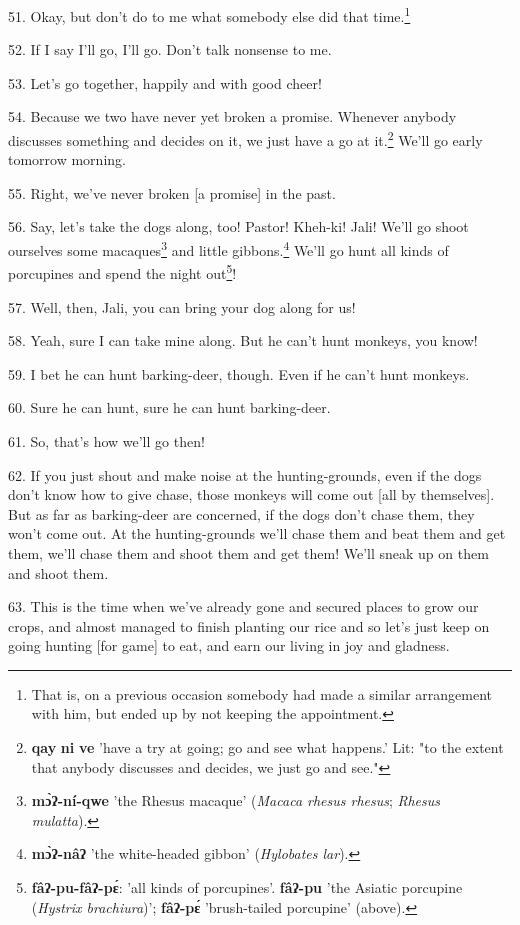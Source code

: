 51. Okay, but don't do to me what somebody else did that time.\footnote{That is, on a previous occasion somebody had made a similar arrangement with him, but ended up by not keeping the appointment.}

52. If I say I'll go, I'll go. Don't talk nonsense to me.

53. Let's go together, happily and with good cheer!

54. Because we two have never yet broken a promise. Whenever anybody discusses
something and decides on it, we just have a go at it.\footnote{\textbf{qay} \textbf{ni} \textbf{ve} 'have a try at going; go and see what happens.' Lit: "to the extent that anybody discusses and decides, we just go and see."} We'll go early tomorrow
morning.

55. Right, we've never broken [a promise] in the past.

56. Say, let's take the dogs along, too! Pastor! Kheh-ki! Jali! We'll go shoot
ourselves some macaques\footnote{\textbf{mɔ̀ʔ-ní-qwe} 'the Rhesus macaque' (\textit{Macaca rhesus rhesus}; \textit{Rhesus mulatta}).} and little gibbons.\footnote{\textbf{mɔ̀ʔ-nâʔ} 'the white-headed gibbon' (\textit{Hylobates lar}).} We'll go hunt all kinds of
porcupines and spend the night out\footnote{\textbf{fâʔ-pu-fâʔ-pɛ́}: 'all kinds of porcupines'. \textbf{fâʔ-pu} 'the Asiatic porcupine (\textit{Hystrix brachiura})'; \textbf{fâʔ-pɛ́} 'brush-tailed porcupine' (above).}!

57. Well, then, Jali, you can bring your dog along for us!

58. Yeah, sure I can take mine along. But he can't hunt monkeys, you know!

59. I bet he can hunt barking-deer, though. Even if he can't hunt monkeys.

60. Sure he can hunt, sure he can hunt barking-deer.

61. So, that's how we'll go then!

62. If you just shout and make noise at the hunting-grounds, even if the dogs don't
know how to give chase, those monkeys will come out [all by themselves]. But as
far as barking-deer are concerned, if the dogs don't chase them, they won't come
out. At the hunting-grounds we'll chase them and beat them and get them, we'll
chase them and shoot them and get them! We'll sneak up on them and shoot them.

63. This is the time when we've already gone and secured places to grow our crops,
and almost managed to finish planting our rice and so let's just keep on going
hunting [for game] to eat, and earn our living in joy and gladness.

